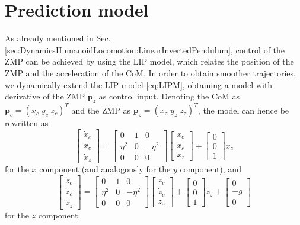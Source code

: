 \section{Prediction model}
As already mentioned in Sec. \ref{sec:DynamicsHumanoidLocomotion:LinearInvertedPendulum},
control of the ZMP can be achieved by using the LIP model, which relates the 
position of the ZMP and the acceleration of the CoM. In order to obtain smoother
trajectories, we dynamically extend the LIP model \eqref{eq:LIPM}, obtaining a
model with derivative of the ZMP $\dot{\bm{p}}_z$ as control input. Denoting
the CoM as $\bm{p}_c = (x_c \; y_c \; z_c)^T$ and the ZMP as $\bm{p}_z = (x_z \; y_z \; z_z)^T$, the 
model can hence be rewritten as
\begin{equation}
    \label{eq:LIPM-x-dynamic-extension}
    \begin{bmatrix}
        \dot{x}_c \\ \ddot{x}_c \\ \dot{x}_z 
    \end{bmatrix}
    =
    \begin{bmatrix}
        0 & 1 & 0 \\ 
        \eta^2 & 0 & -\eta^2 \\
        0 & 0 & 0
    \end{bmatrix}
    \begin{bmatrix}
        x_c \\ \dot{x}_c \\ x_z 
    \end{bmatrix}
    +
    \begin{bmatrix}
        0 \\ 0 \\ 1
    \end{bmatrix}
    \dot{x}_z
\end{equation}
for the $x$ component (and analogously for the $y$ component), and
\begin{equation}
    \label{eq:LIPM-x-dynamic-extension}
    \begin{bmatrix}
        \dot{z}_c \\ \ddot{z}_c \\ \dot{z}_z 
    \end{bmatrix}
    =
    \begin{bmatrix}
        0 & 1 & 0 \\ 
        \eta^2 & 0 & -\eta^2 \\
        0 & 0 & 0
    \end{bmatrix}
    \begin{bmatrix}
        z_c \\ \dot{z}_c \\ z_z 
    \end{bmatrix}
    +
    \begin{bmatrix}
        0 \\ 0 \\ 1
    \end{bmatrix}
    \dot{z}_z
    +
    \begin{bmatrix}
        0 \\ -g \\ 0
    \end{bmatrix}
\end{equation}
for the $z$ component.

